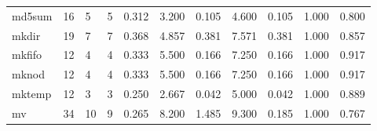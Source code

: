 \begin{longtable}{lp{1.2cm}p{1.2cm}p{1.2cm}p{1.2cm}p{1.2cm}p{1.2cm}p{1.2cm}p{1.2cm}p{1.2cm}p{1.2cm}}
md5sum    &                           16 &                  5 &                                 5 &                                      0.312 &                                  3.200 &                                        0.105 &                             4.600 &                                   0.105 &                              1.000 &                                              0.800 \\
mkdir     &                           19 &                  7 &                                 7 &                                      0.368 &                                  4.857 &                                        0.381 &                             7.571 &                                   0.381 &                              1.000 &                                              0.857 \\
mkfifo    &                           12 &                  4 &                                 4 &                                      0.333 &                                  5.500 &                                        0.166 &                             7.250 &                                   0.166 &                              1.000 &                                              0.917 \\
mknod     &                           12 &                  4 &                                 4 &                                      0.333 &                                  5.500 &                                        0.166 &                             7.250 &                                   0.166 &                              1.000 &                                              0.917 \\
mktemp    &                           12 &                  3 &                                 3 &                                      0.250 &                                  2.667 &                                        0.042 &                             5.000 &                                   0.042 &                              1.000 &                                              0.889 \\
mv        &                           34 &                 10 &                                 9 &                                      0.265 &                                  8.200 &                                        1.485 &                             9.300 &                                   0.185 &                              1.000 &                                              0.767 \\

\end{longtable}
